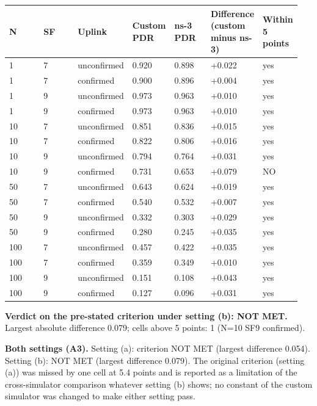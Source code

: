 {\scriptsize\raggedright
\begin{longtable}{p{0.136\linewidth}p{0.136\linewidth}p{0.136\linewidth}p{0.136\linewidth}p{0.136\linewidth}p{0.136\linewidth}p{0.136\linewidth}}
\toprule
N & SF & Uplink & Custom PDR & ns-3 PDR & Difference (custom minus ns-3) & Within 5 points \\
\midrule
\endhead
1 & 7 & unconfirmed & 0.920 & 0.898 & +0.022 & yes \\
1 & 7 & confirmed & 0.900 & 0.896 & +0.004 & yes \\
1 & 9 & unconfirmed & 0.973 & 0.963 & +0.010 & yes \\
1 & 9 & confirmed & 0.973 & 0.963 & +0.010 & yes \\
10 & 7 & unconfirmed & 0.851 & 0.836 & +0.015 & yes \\
10 & 7 & confirmed & 0.822 & 0.806 & +0.016 & yes \\
10 & 9 & unconfirmed & 0.794 & 0.764 & +0.031 & yes \\
10 & 9 & confirmed & 0.731 & 0.653 & +0.079 & NO \\
50 & 7 & unconfirmed & 0.643 & 0.624 & +0.019 & yes \\
50 & 7 & confirmed & 0.540 & 0.532 & +0.007 & yes \\
50 & 9 & unconfirmed & 0.332 & 0.303 & +0.029 & yes \\
50 & 9 & confirmed & 0.280 & 0.245 & +0.035 & yes \\
100 & 7 & unconfirmed & 0.457 & 0.422 & +0.035 & yes \\
100 & 7 & confirmed & 0.359 & 0.349 & +0.010 & yes \\
100 & 9 & unconfirmed & 0.151 & 0.108 & +0.043 & yes \\
100 & 9 & confirmed & 0.127 & 0.096 & +0.031 & yes \\
\bottomrule
\end{longtable}}

\textbf{Verdict on the pre-stated criterion under setting (b): NOT MET.} Largest absolute difference 0.079; cells above 5 points: 1 (N=10 SF9 confirmed).

\textbf{Both settings (A3).} Setting (a): criterion NOT MET (largest difference 0.054). Setting (b): NOT MET (largest difference 0.079). The original criterion (setting (a)) was missed by one cell at 5.4 points and is reported as a limitation of the cross-simulator comparison whatever setting (b) shows; no constant of the custom simulator was changed to make either setting pass.

